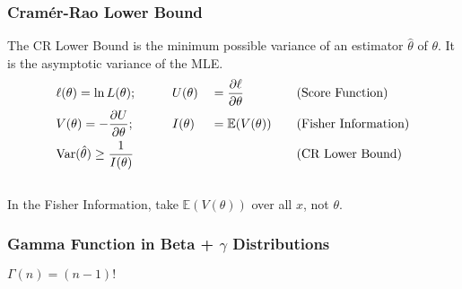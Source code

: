 \documentclass{article}
\begin{document}
\begin{multicols*}{2}
\subsubsection*{Cramér-Rao Lower Bound}
The CR Lower Bound is the minimum possible variance of an estimator $\hat{\theta}$ of $\theta$. It is the asymptotic variance of the MLE.
\vspace{-0.2cm}
{\setlength{\mathindent}{0.5cm}
\begin{alignat*}{4}
    &\ell(\theta) = \ln L(\theta); &&\qquad U(\theta) &&= \frac{\partial \ell}{\partial \theta} &&\mbox{\quad (Score Function)}\\
    &V(\theta) = -\frac{\partial U}{\partial \theta}; &&\qquad I(\theta) &&= \mathbb{E}(V(\theta)) &&\mbox{\quad (Fisher Information)}\\
    &\mbox{Var}(\hat{\theta}) \geq \frac{1}{I(\theta)} && && &&\mbox{\quad (CR Lower Bound)}
\end{alignat*} \vspace{-0.5cm}}\\
\noindent In the Fisher Information, take $\mathbb{E}(V(\theta))$ over all $x$, not $\theta$.
\subsubsection*{Gamma Function in Beta + $\gamma$ Distributions}
$\Gamma(n) = (n-1)!$
\end{multicols*}
\end{document}
